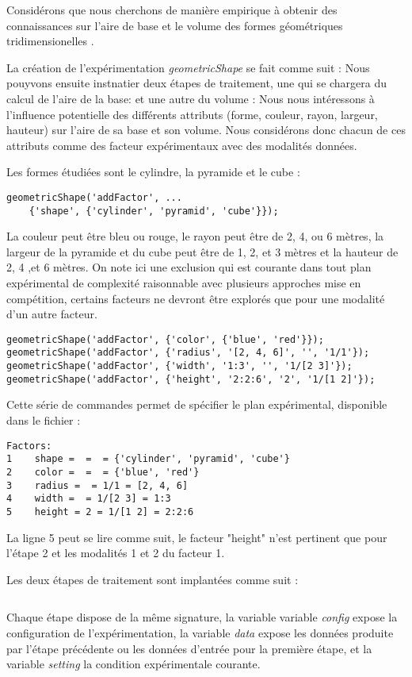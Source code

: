 Considérons que nous cherchons de manière empirique à obtenir des connaissances sur l'aire de base et le volume des formes géométriques tridimensionelles .

La création de l'expérimentation \textsl{geometricShape} se fait comme suit :
Nous pouyvons ensuite instnatier deux étapes de traitement, une qui se chargera du calcul de l'aire de la base:
et une autre du volume :
Nous nous intéressons à l'influence potentielle des différents attributs (forme, couleur, rayon, largeur, hauteur) sur l'aire de sa base et son volume. Nous considérons donc chacun de ces attributs comme des facteur expérimentaux avec des modalités données.

Les formes étudiées sont le cylindre, la pyramide et le cube :
\begin{lstlisting}
geometricShape('addFactor', ...
	{'shape', {'cylinder', 'pyramid', 'cube'}});
\end{lstlisting}
La couleur peut être bleu ou rouge, le rayon peut être de 2, 4, ou 6 mètres, la largeur de la pyramide et du cube peut être de 1, 2, et 3 mètres et la hauteur de 2, 4 ,et 6 mètres. On note ici une exclusion qui est courante dans tout plan expérimental de complexité raisonnable avec plusieurs approches mise en compétition, certains facteurs ne devront être explorés que pour une modalité d'un autre facteur.
\begin{lstlisting}
geometricShape('addFactor', {'color', {'blue', 'red'}});
geometricShape('addFactor', {'radius', '[2, 4, 6]', '', '1/1'});
geometricShape('addFactor', {'width', '1:3', '', '1/[2 3]'});
geometricShape('addFactor', {'height', '2:2:6', '2', '1/[1 2]'});
\end{lstlisting}
Cette série de commandes permet de spécifier le plan expérimental, disponible dans le fichier  :
\begin{lstlisting}
Factors:
1    shape =  =  = {'cylinder', 'pyramid', 'cube'}
2    color =  =  = {'blue', 'red'}
3    radius =  = 1/1 = [2, 4, 6]
4    width =  = 1/[2 3] = 1:3
5    height = 2 = 1/[1 2] = 2:2:6
\end{lstlisting}
La ligne 5 peut se lire comme suit, le facteur "height" n'est pertinent que pour l'étape 2 et les modalités 1 et 2 du facteur 1.

Les deux étapes de traitement sont implantées comme suit :
\begin{lstlisting}

\end{lstlisting}
Chaque étape dispose de la même signature, la variable variable \textsl{config} expose la configuration de l'expérimentation, la variable \textsl{data} expose les données produite par l'étape précédente ou les données d'entrée pour la première étape, et la variable \textsl{setting} la condition expérimentale courante. 

